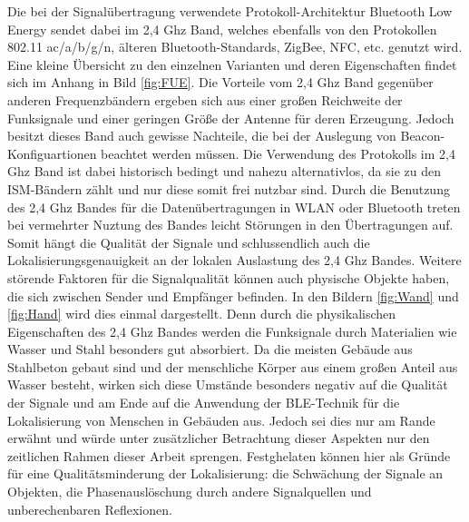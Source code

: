 Die bei der Signalübertragung verwendete Protokoll-Architektur Bluetooth Low Energy sendet dabei im 2,4 Ghz Band, welches ebenfalls von den Protokollen 802.11 ac/a/b/g/n, älteren Bluetooth-Standards, ZigBee, NFC, etc. genutzt wird. Eine kleine Übersicht zu den einzelnen Varianten und deren Eigenschaften findet sich im Anhang in Bild \ref{fig:FUE}. Die Vorteile vom 2,4 Ghz Band gegenüber anderen Frequenzbändern ergeben sich aus einer großen Reichweite der Funksignale und einer geringen Größe der Antenne für deren Erzeugung. Jedoch besitzt dieses Band auch gewisse Nachteile, die bei der Auslegung von Beacon-Konfiguartionen beachtet werden müssen. Die Verwendung des Protokolls im 2,4 Ghz Band ist dabei historisch bedingt und nahezu alternativlos, da sie zu den ISM-Bändern \cite{BuNet} zählt und nur diese somit frei nutzbar sind. Durch die Benutzung des 2,4 Ghz Bandes für die Datenübertragungen in WLAN oder Bluetooth treten bei vermehrter Nuztung des Bandes leicht Störungen in den Übertragungen auf. Somit hängt die Qualität der Signale und schlussendlich auch die Lokalisierungsgenauigkeit an der lokalen Auslastung des 2,4 Ghz Bandes. Weitere störende Faktoren für die Signalqualität  können auch physische Objekte haben, die sich zwischen Sender und Empfänger befinden. In den Bildern \ref{fig:Wand} und \ref{fig:Hand} wird dies einmal dargestellt. Denn durch die physikalischen Eigenschaften des 2,4 Ghz Bandes werden die Funksignale durch Materialien wie Wasser und Stahl besonders gut absorbiert. Da die meisten Gebäude aus Stahlbeton gebaut sind und der menschliche Körper aus einem großen Anteil aus Wasser besteht, wirken sich diese Umstände besonders negativ auf die Qualität der Signale und am Ende auf die Anwendung der BLE-Technik für die Lokalisierung von Menschen in Gebäuden aus. Jedoch sei dies nur am Rande erwähnt und würde unter zusätzlicher Betrachtung dieser Aspekten nur den zeitlichen Rahmen dieser Arbeit sprengen. Festghelaten können hier als Gründe für eine Qualitätsminderung der Lokalisierung: die Schwächung der Signale an Objekten, die Phasenauslöschung durch andere Signalquellen und unberechenbaren Reflexionen.\\ \\
